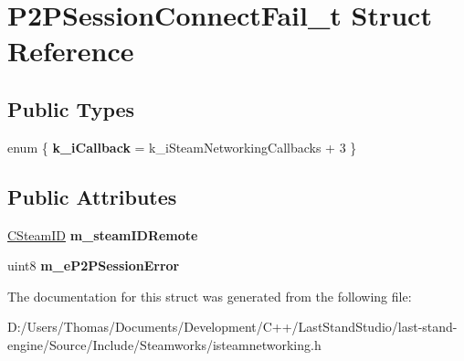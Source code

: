 \hypertarget{structP2PSessionConnectFail__t}{}\section{P2\+P\+Session\+Connect\+Fail\+\_\+t Struct Reference}
\label{structP2PSessionConnectFail__t}
\subsection*{Public Types}
\begin{DoxyCompactItemize}
\item 
\hypertarget{structP2PSessionConnectFail__t_ad50ea12422a9d0886d89fa49fd6de20b}{}enum \{ {\bfseries k\+\_\+i\+Callback} = k\+\_\+i\+Steam\+Networking\+Callbacks + 3
 \}\label{structP2PSessionConnectFail__t_ad50ea12422a9d0886d89fa49fd6de20b}

\end{DoxyCompactItemize}
\subsection*{Public Attributes}
\begin{DoxyCompactItemize}
\item 
\hypertarget{structP2PSessionConnectFail__t_ade3d751a2f4a4c553aa2121d8468a279}{}\hyperlink{classCSteamID}{C\+Steam\+I\+D} {\bfseries m\+\_\+steam\+I\+D\+Remote}\label{structP2PSessionConnectFail__t_ade3d751a2f4a4c553aa2121d8468a279}

\item 
\hypertarget{structP2PSessionConnectFail__t_aa40014390a39c69faf190805ef4ffa2a}{}uint8 {\bfseries m\+\_\+e\+P2\+P\+Session\+Error}\label{structP2PSessionConnectFail__t_aa40014390a39c69faf190805ef4ffa2a}

\end{DoxyCompactItemize}


The documentation for this struct was generated from the following file\+:\begin{DoxyCompactItemize}
\item 
D\+:/\+Users/\+Thomas/\+Documents/\+Development/\+C++/\+Last\+Stand\+Studio/last-\/stand-\/engine/\+Source/\+Include/\+Steamworks/isteamnetworking.\+h\end{DoxyCompactItemize}
